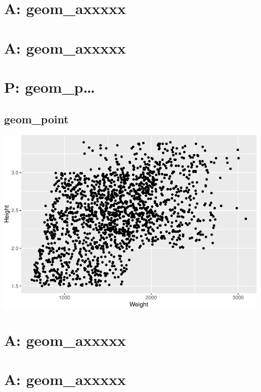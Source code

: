 \documentclass[
]{book}
\begin{document}
\hypertarget{a-geom_axxxxx-4}{%
\chapter{A: geom\_axxxxx}\label{a-geom_axxxxx-4}}

\hypertarget{a-geom_axxxxx-5}{%
\chapter{A: geom\_axxxxx}\label{a-geom_axxxxx-5}}

\hypertarget{p-geom_p}{%
\chapter{P: geom\_p\ldots{}}\label{p-geom_p}}

\hypertarget{point}{%
\section{geom\_point}\label{point}}

\includegraphics{Data-Visualisation-geom-Encyclopedia_files/figure-latex/unnamed-chunk-45-1.pdf}

\hypertarget{a-geom_axxxxx-6}{%
\chapter{A: geom\_axxxxx}\label{a-geom_axxxxx-6}}

\hypertarget{a-geom_axxxxx-7}{%
\chapter{A: geom\_axxxxx}\label{a-geom_axxxxx-7}}
\end{document}
